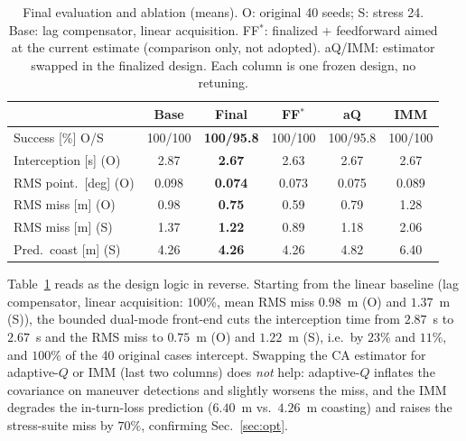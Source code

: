 \documentclass[conference]{IEEEtran}
\begin{document}
\begin{table}[t]
\centering\scriptsize
\caption{Final evaluation and ablation (means). O: original 40 seeds; S: stress 24. Base: lag compensator, linear acquisition. FF$^*$: finalized $+$ feedforward aimed at the current estimate (comparison only, not adopted). aQ/IMM: estimator swapped in the finalized design. Each column is one frozen design, no retuning.}
\label{tab:final}
\begin{tabular}{@{}lccccc@{}}
\toprule
 & Base & \textbf{Final} & FF$^*$ & aQ & IMM \\
\midrule
Success [\%] O/S      & 100/100 & \textbf{100/95.8} & 100/100 & 100/95.8 & 100/100 \\
Interception [s] (O)  & 2.87 & \textbf{2.67} & 2.63 & 2.67 & 2.67 \\
RMS point.\ [deg] (O) & 0.098 & \textbf{0.074} & 0.073 & 0.075 & 0.089 \\
RMS miss [m] (O)      & 0.98 & \textbf{0.75} & 0.59 & 0.79 & 1.28 \\
RMS miss [m] (S)      & 1.37 & \textbf{1.22} & 0.89 & 1.18 & 2.06 \\
Pred.\ coast [m] (S)  & 4.26 & \textbf{4.26} & 4.26 & 4.82 & 6.40 \\
\bottomrule
\end{tabular}
\end{table}

Table~\ref{tab:final} reads as the design logic in reverse. Starting from the linear baseline (lag compensator, linear acquisition: $100\%$, mean RMS miss $0.98$~m (O) and $1.37$~m (S)), the bounded dual-mode front-end cuts the interception time from $2.87$~s to $2.67$~s and the RMS miss to $0.75$~m (O) and $1.22$~m (S), i.e.\ by $23\%$ and $11\%$, and $100\%$ of the 40 original cases intercept. Swapping the CA estimator for adaptive-$Q$ or IMM (last two columns) does \emph{not} help: adaptive-$Q$ inflates the covariance on maneuver detections and slightly worsens the miss, and the IMM degrades the in-turn-loss prediction ($6.40$~m vs.\ $4.26$~m coasting) and raises the stress-suite miss by $70\%$, confirming Sec.~\ref{sec:opt}.
\end{document}
